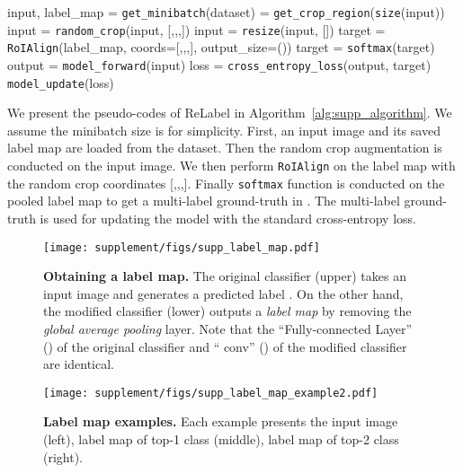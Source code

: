 \documentclass[final]{cvpr}
\newcommand\ours{{{\mbox{ReLabel}}}\xspace}
\newcommand\ourframework{{{LabelPooling}}\xspace}
\begin{document}
\newcommand\graycomm[1]{{\textcolor{airforceblue}{#1}}}
\begin{algorithm*}[h]
  \caption{\ours Pseudo-code }
  \begin{algorithmic}[1]
    \State \graycomm{\# Load image data and label maps (assume the minibatch size is  for simplicity)}
    \State input, label\_map = \texttt{get\_minibatch}(dataset) 
    \State \graycomm{\# Random crop augmentation}
    \State [,,,] = \texttt{get\_crop\_region}(\texttt{size}(input))
    \State input = \texttt{random\_crop}(input, [,,,])
    \State input = \texttt{resize}(input, [])
    \State \graycomm{\# \ourframework process}
    \State target = \texttt{RoIAlign}(label\_map, coords=[,,,], output\_size=())
    \State target = \texttt{softmax}(target)
    \State \graycomm{\# Update model }
    \State output = \texttt{model\_forward}(input)
    \State loss = \texttt{cross\_entropy\_loss}(output, target)
    \State \texttt{model\_update}(loss)
    \EndFor
  \end{algorithmic}
  \label{alg:supp_algorithm}
\end{algorithm*}



We present the pseudo-codes of \ours in Algorithm~\ref{alg:supp_algorithm}.
We assume the minibatch size is  for simplicity. 
First, an input image and its saved label map are loaded from the dataset. 
Then the random crop augmentation is conducted on the input image. 
We then perform \texttt{RoIAlign} on the label map with the random crop coordinates [,,,].
Finally \texttt{softmax} function is conducted on the pooled label map to get a multi-label ground-truth in .
The multi-label ground-truth is used for updating the model with the standard cross-entropy loss.  
\begin{figure*}[h]
    \centering
    \texttt{[image: supplement/figs/supp\_label\_map.pdf]}
    \caption{\textbf{Obtaining a label map.}
    The original classifier (upper) takes an input image and generates a predicted label . 
    On the other hand, the modified classifier (lower) outputs a \textit{label map}  by removing the \textit{global average pooling} layer. 
    Note that the ``Fully-connected Layer'' () of the original classifier and `` conv'' () of the modified classifier are identical.
    }
    \label{fig:supp_label_map}
\end{figure*}

\begin{figure*}[h]
    \centering
    \texttt{[image: supplement/figs/supp\_label\_map\_example2.pdf]}
    \caption{\textbf{Label map examples.}
    Each example presents the input image (left), label map of top-1 class (middle), label map of top-2 class (right). 
    }
    \label{fig:supp_label_map_example}
\end{figure*}
\end{document}
